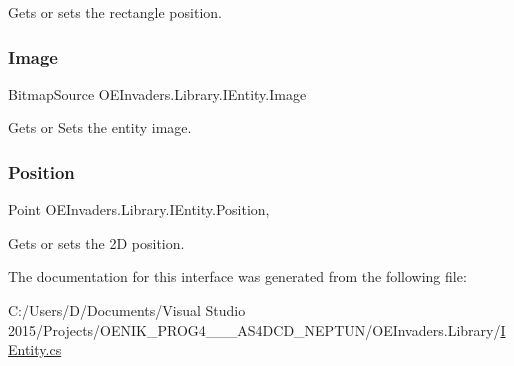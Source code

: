 Gets or sets the rectangle position. 

\mbox{\label{interface_o_e_invaders_1_1_library_1_1_i_entity_a61764ef4e791af7a07843cfe1edddbc7}} 
\subsubsection{\texorpdfstring{Image}{Image}}
{\footnotesize\ttfamily Bitmap\+Source O\+E\+Invaders.\+Library.\+I\+Entity.\+Image\hspace{0.3cm}{\ttfamily [get]}}



Gets or Sets the entity image. 

\mbox{\label{interface_o_e_invaders_1_1_library_1_1_i_entity_ab92400fe8382c46f229b50eaaef8ed67}} 
\subsubsection{\texorpdfstring{Position}{Position}}
{\footnotesize\ttfamily Point O\+E\+Invaders.\+Library.\+I\+Entity.\+Position\hspace{0.3cm}{\ttfamily [get]}, {\ttfamily [set]}}



Gets or sets the 2D position. 



The documentation for this interface was generated from the following file\+:\begin{DoxyCompactItemize}
\item 
C\+:/\+Users/\+D/\+Documents/\+Visual Studio 2015/\+Projects/\+O\+E\+N\+I\+K\+\_\+\+P\+R\+O\+G4\+\_\+\_\+\_\+\+A\+S4\+D\+C\+D\+\_\+\+N\+E\+P\+T\+U\+N/\+O\+E\+Invaders.\+Library/\mbox{\hyperlink{_i_entity_8cs}{I\+Entity.\+cs}}\end{DoxyCompactItemize}
